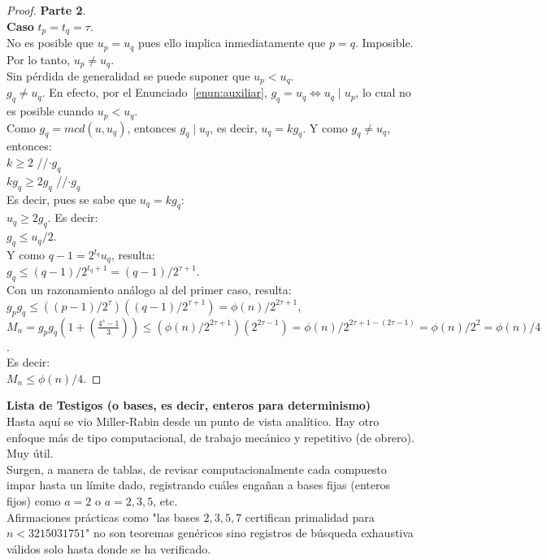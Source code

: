 \begin{proof} \textbf{Parte 2}. \\
\textbf{Caso} $t_p = t_q=\tau$. \\
No es posible que $u_p=u_q$ pues ello implica inmediatamente que $p=q$. Imposible. Por lo tanto, $u_p \neq u_q$. \\
Sin pérdida de generalidad se puede suponer que $u_p < u_q$. \\
$g_q \neq u_q$. En efecto, por el Enunciado~\ref{enun:auxiliar}, $g_q=u_q \iff u_q\mid u_p$, lo cual no es posible cuando $u_p < u_q$. \\
Como $g_q = mcd(u,u_q)$, entonces $g_q \mid u_q$, es decir, $u_q=kg_q$. Y como $g_q \neq u_q$, entonces: \\
$k \geq 2$ \qquad\qquad //$\cdot g_q$ \\
$kg_q \geq 2g_q$ \qquad //$\cdot g_q$ \\
Es decir, pues se sabe que $u_q=kg_q$: \\
$u_q \geq 2g_q$. Es decir: \\
$g_q \leq u_q/2$. \\
Y como $q-1=2^{t_q}u_q$, resulta: \\
$g_q \leq (q-1)/2^{t_q +1} = (q-1)/2^{\tau +1}$. \\
Con un razonamiento análogo al del primer caso, resulta: \\
$g_pg_q \leq  ((p-1)/2^{\tau})((q-1)/2^{\tau +1}) =  \phi(n)/ 2^{2\tau+1}$, \\
$M_n = g_pg_q(1+(\frac{4^s - 1}{3})) \leq (\phi(n) / 2^{2\tau+1})(2^{2\tau - 1}) = \phi(n) / 2^{2\tau+1-(2\tau - 1)} = \phi(n) / 2^{2} = \phi(n) / 4$. \\
Es decir:  \\
$M_n \leq \phi(n)/4$. 
\end{proof}

\textbf{Lista de Testigos (o bases, es decir, enteros para determinismo)} \\
Hasta aquí se vio Miller-Rabin desde un punto de vista analítico.
Hay otro enfoque más de tipo computacional, de trabajo mecánico y repetitivo (de obrero). Muy útil. \\
Surgen, a manera de tablas, de revisar computacionalmente cada compuesto impar hasta un límite dado, registrando cuáles engañan a bases fijas (enteros fijos) como $a=2$ o $a=2,3,5$, etc. \\
Afirmaciones prácticas como "las bases $2,3,5,7$ certifican primalidad para $n<3215031751$" \; no son teoremas genéricos sino registros de búsqueda exhaustiva válidos solo hasta donde se ha verificado. \\

